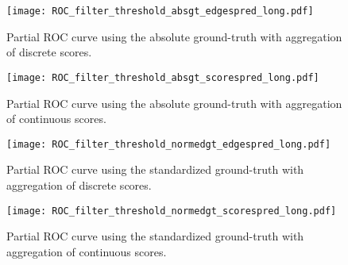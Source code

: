 \begin{figure}[h!]
    \centering
    \texttt{[image: ROC\_filter\_threshold\_absgt\_edgespred\_long.pdf]}
    \caption{Partial ROC curve using the absolute ground-truth with aggregation of discrete scores.}
\end{figure}
\begin{figure}[h!]
    \centering
    \texttt{[image: ROC\_filter\_threshold\_absgt\_scorespred\_long.pdf]}
    \caption{Partial ROC curve using the absolute ground-truth with aggregation of continuous scores.}
\end{figure}
\begin{figure}[h!]
    \centering
    \texttt{[image: ROC\_filter\_threshold\_normedgt\_edgespred\_long.pdf]}
    \caption{Partial ROC curve using the standardized ground-truth with aggregation of discrete scores.}
\end{figure}
\begin{figure}[h!]
    \centering
    \texttt{[image: ROC\_filter\_threshold\_normedgt\_scorespred\_long.pdf]}
    \caption{Partial ROC curve using the standardized ground-truth with aggregation of continuous scores.}
\end{figure}

\newpage\phantom{blabla}